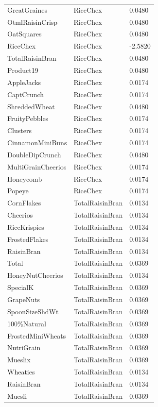 \begin{table}[!htbp]
\begin{tabular}{lll}
\\
GreatGraines & RiceChex & 0.0480
\\
OtmlRaisinCrisp & RiceChex & 0.0480
\\
OatSquares & RiceChex & 0.0480
\\
RiceChex & RiceChex & -2.5820
\\
TotalRaisinBran & RiceChex & 0.0480
\\
Product19 & RiceChex & 0.0480
\\
AppleJacks & RiceChex & 0.0174
\\
CaptCrunch & RiceChex & 0.0174
\\
ShreddedWheat & RiceChex & 0.0480
\\
FruityPebbles & RiceChex & 0.0174
\\
Clusters & RiceChex & 0.0174
\\
CinnamonMiniBuns & RiceChex & 0.0174
\\
DoubleDipCrunch & RiceChex & 0.0480
\\
MultiGrainCheerios & RiceChex & 0.0174
\\
Honeycomb & RiceChex & 0.0174
\\
Popeye & RiceChex & 0.0174
\\
CornFlakes & TotalRaisinBran & 0.0134
\\
Cheerios & TotalRaisinBran & 0.0134
\\
RiceKrispies & TotalRaisinBran & 0.0134
\\
FrostedFlakes & TotalRaisinBran & 0.0134
\\
RaisinBran & TotalRaisinBran & 0.0134
\\
Total & TotalRaisinBran & 0.0369
\\
HoneyNutCheerios & TotalRaisinBran & 0.0134
\\
SpecialK & TotalRaisinBran & 0.0369
\\
GrapeNuts & TotalRaisinBran & 0.0369
\\
SpoonSizeShdWt & TotalRaisinBran & 0.0369
\\
100\%Natural & TotalRaisinBran & 0.0369
\\
FrostedMiniWheats & TotalRaisinBran & 0.0369
\\
NutriGrain & TotalRaisinBran & 0.0369
\\
Mueslix & TotalRaisinBran & 0.0369
\\
Wheaties & TotalRaisinBran & 0.0134
\\
RaisinBran & TotalRaisinBran & 0.0134
\\
Muesli & TotalRaisinBran & 0.0369
\\

\end{tabular}
\end{table}
